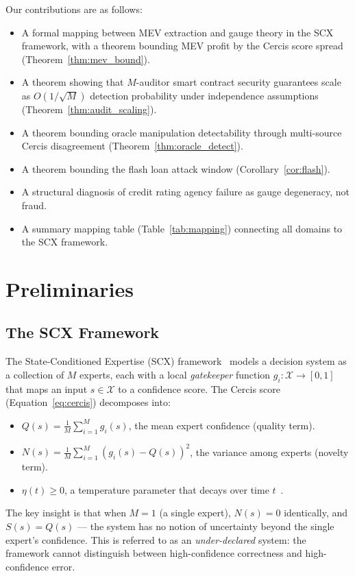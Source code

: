 \documentclass[12pt,a4paper]{article}
\theoremstyle{remark}
\newcommand{\X}{\mathcal{X}}
\newcommand{\Cercis}{\textsf{Cercis}}
\begin{document}
Our contributions are as follows:
\begin{itemize}
\item A formal mapping between MEV extraction and gauge theory in the SCX
framework, with a theorem bounding MEV profit by the \Cercis{} score spread
(Theorem~\ref{thm:mev_bound}).
\item A theorem showing that $M$-auditor smart contract security guarantees scale
as $O(1/\sqrt{M})$ detection probability under independence assumptions
(Theorem~\ref{thm:audit_scaling}).
\item A theorem bounding oracle manipulation detectability through multi-source
\Cercis{} disagreement (Theorem~\ref{thm:oracle_detect}).
\item A theorem bounding the flash loan attack window (Corollary~\ref{cor:flash}).
\item A structural diagnosis of credit rating agency failure as gauge degeneracy,
not fraud.
\item A summary mapping table (Table~\ref{tab:mapping}) connecting all domains
to the SCX framework.
\end{itemize}

\section{Preliminaries}
\label{sec:preliminaries}

\subsection{The SCX Framework}

The State-Conditioned Expertise (SCX) framework~\cite{scx2025} models a
decision system as a collection of $M$ experts, each with a local
\emph{gatekeeper} function $g_i: \X \rightarrow [0,1]$ that maps an input
$s \in \X$ to a confidence score. The \Cercis{} score
(Equation~\ref{eq:cercis}) decomposes into:
\begin{itemize}
\item $Q(s) = \frac{1}{M} \sum_{i=1}^M g_i(s)$, the mean expert confidence
(quality term).
\item $N(s) = \frac{1}{M} \sum_{i=1}^M (g_i(s) - Q(s))^2$, the variance
among experts (novelty term).
\item $\eta(t) \geq 0$, a temperature parameter that decays over time
$t$~\cite{yajie2025}.
\end{itemize}

The key insight is that when $M=1$ (a single expert), $N(s)=0$ identically, and
$S(s)=Q(s)$ --- the system has no notion of uncertainty beyond the single
expert's confidence. This is referred to as an \emph{under-declared} system:
the framework cannot distinguish between high-confidence correctness and
high-confidence error.
\end{document}
